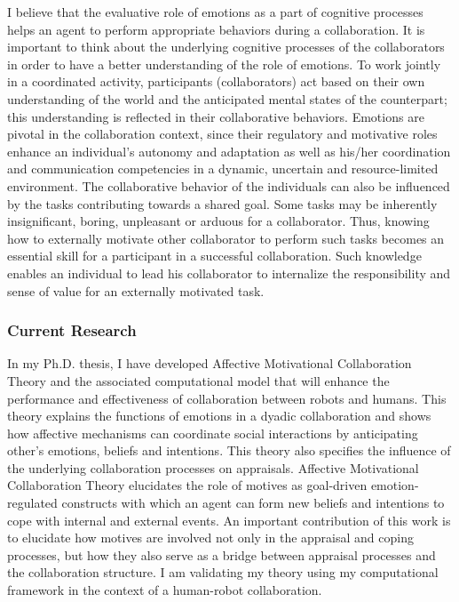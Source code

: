 \documentclass[a4paper, 11pt]{article}
\begin{document}
\begin{small}
I believe that the evaluative role of emotions as a part of cognitive processes
helps an agent to perform appropriate behaviors during a collaboration. It is
important to think about the underlying cognitive processes of the collaborators
in order to have a better understanding of the role of emotions. To work jointly
in a coordinated activity, participants (collaborators) act based on their own
understanding of the world and the anticipated mental states of the counterpart;
this understanding is reflected in their collaborative behaviors. Emotions are
pivotal in the collaboration context, since their regulatory and motivative
roles enhance an individual's autonomy and adaptation as well as his/her
coordination and communication competencies in a dynamic, uncertain and
resource-limited environment. The collaborative behavior of the individuals can
also be influenced by the tasks contributing towards a shared goal. Some tasks
may be inherently insignificant, boring, unpleasant or arduous for a
collaborator. Thus, knowing how to externally motivate other collaborator to
perform such tasks becomes an essential skill for a participant in a successful
collaboration. Such knowledge enables an individual to lead his collaborator to
internalize the responsibility and sense of value for an externally motivated
task.

\subsubsection*{Current Research}

In my Ph.D. thesis, I have developed Affective Motivational Collaboration Theory
and the associated computational model that will enhance the performance and
effectiveness of collaboration between robots and humans. This theory explains
the functions of emotions in a dyadic collaboration and shows how affective
mechanisms can coordinate social interactions by anticipating other's emotions,
beliefs and intentions. This theory also specifies the influence of the
underlying collaboration processes on appraisals. Affective Motivational
Collaboration Theory elucidates the role of motives as goal-driven
emotion-regulated constructs with which an agent can form new beliefs and
intentions to cope with internal and external events. An important contribution
of this work is to elucidate how motives are involved not only in the appraisal
and coping processes, but how they also serve as a bridge between appraisal
processes and the collaboration structure. I am validating my theory using my
computational framework in the context of a human-robot collaboration.


\end{small}
\end{document}
